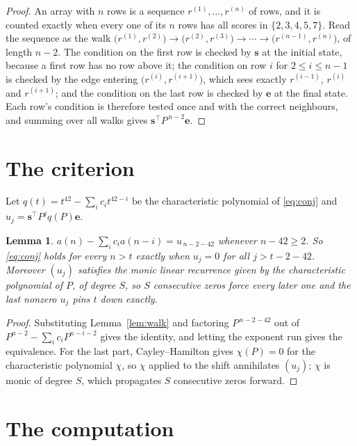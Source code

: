 \documentclass[11pt,a4paper]{article}
\theoremstyle{plain}
\newtheorem{lemma}[theorem]{Lemma}
\theoremstyle{definition}
\begin{document}
\begin{proof}
An array with $n$ rows is a sequence $r^{(1)},\dots,r^{(n)}$ of rows, and it is counted
exactly when every one of its $n$ rows has all scores in $\{2,3,4,5,7\}$. Read the sequence as the
walk $\bigl(r^{(1)},r^{(2)}\bigr)\to\bigl(r^{(2)},r^{(3)}\bigr)\to\cdots\to
\bigl(r^{(n-1)},r^{(n)}\bigr)$, of length $n-2$. The condition on the first row is
checked by $\mathbf{s}$ at the initial state, because a first row has no row above it; the
condition on row $i$ for $2\le i\le n-1$ is checked by the edge entering
$\bigl(r^{(i)},r^{(i+1)}\bigr)$, which sees exactly $r^{(i-1)}$, $r^{(i)}$ and
$r^{(i+1)}$; and the condition on the last row is checked by $\mathbf{e}$ at the final
state. Each row's condition is therefore tested once and with the correct neighbours, and
summing over all walks gives $\mathbf{s}^{\!\top}P^{\,n-2}\mathbf{e}$.
\end{proof}

\section{The criterion}

Let $q(t)=t^{42}-\sum_i c_i t^{42-i}$ be the characteristic polynomial of
\eqref{eq:conj} and $u_j=\mathbf{s}^{\!\top}P^{j}q(P)\mathbf{e}$.

\begin{lemma}\label{lem:crit}
$a(n)-\sum_i c_i a(n-i)=u_{\,n-2-42}$ whenever $n-42\ge2$. So \eqref{eq:conj}
holds for every $n>t$ exactly when $u_j=0$ for all $j>t-2-42$. Moreover $(u_j)$
satisfies the monic linear recurrence given by the characteristic polynomial of $P$, of
degree $S$, so $S$ consecutive zeros force every later one and the last nonzero $u_j$ pins
$t$ down exactly.
\end{lemma}

\begin{proof}
Substituting Lemma~\ref{lem:walk} and factoring $P^{\,n-2-42}$ out of
$P^{n-2}-\sum_i c_i P^{n-i-2}$ gives the identity, and letting the exponent run gives the
equivalence. For the last part, Cayley--Hamilton gives $\chi(P)=0$ for the characteristic
polynomial $\chi$, so $\chi$ applied to the shift annihilates $(u_j)$; $\chi$ is monic of
degree $S$, which propagates $S$ consecutive zeros forward.
\end{proof}

\section{The computation}
\end{document}
